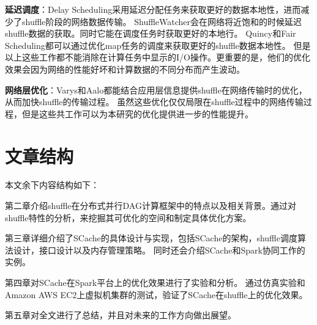 \textbf{延迟调度}：Delay Scheduling\cite{delay}采用延迟分配任务来获取更好的数据本地性，进而减少了shuffle阶段的网络数据传输。
ShuffleWatcher\cite{shufflewatcher}会在网络将近饱和的时候延迟shuffle数据的获取。同时它能在调度任务时获取更好的本地行。
Quincy\cite{quincy}和Fair Scheduling\cite{preemptive}都可以通过优化map任务的调度来获取更好的shuffle数据本地性。
但是以上这些工作都不能消除在计算任务中显示的I/O操作。更重要的是，他们的优化效果会因为网络的性能好坏和计算数据的不同分布而产生波动。

\textbf{网络层优化}：Varys\cite{varys}和Aalo\cite{aalo}都能结合应用层信息提供shuffle在网络传输时的优化，从而加快shuffle的传输过程。
虽然这些优化仅仅局限在shuffle过程中的网络传输过程，但是这些共工作可以为本研究的优化提供进一步的性能提升。

\section{文章结构}

本文余下内容结构如下：

第二章介绍shuffle在分布式并行DAG计算框架中的特点以及相关背景。通过对shuffle特性的分析，来挖掘其可优化的空间和制定具体优化方案。

第三章详细介绍了SCache的具体设计与实现，包括SCache的架构，shuffle调度算法设计，接口设计以及内存管理策略。
同时还会介绍SCache和Spark协同工作的实例。

第四章对SCache在Spark平台上的优化效果进行了实验和分析。
通过仿真实验和Amazon AWS EC2上虚拟机集群的测试，验证了SCache在shuffle上的优化效果。

第五章对全文进行了总结，并且对未来的工作方向做出展望。







